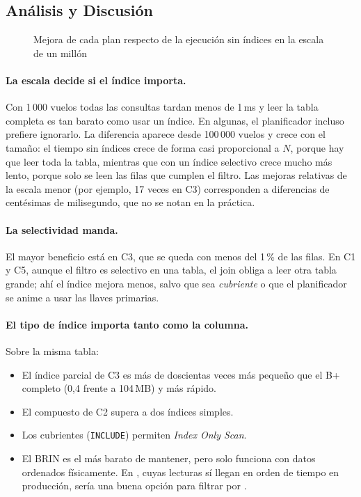 \subsection{Análisis y Discusión}

\begin{figure}[H]\centering{}\caption{Mejora de cada plan respecto de la ejecución sin índices en la escala de un millón}\end{figure}

\paragraph{La escala decide si el índice importa.} Con 1\,000 vuelos todas las consultas tardan menos de 1\,ms y leer la tabla completa es tan barato como usar un índice. En algunas, el planificador incluso prefiere ignorarlo. La diferencia aparece desde 100\,000 vuelos y crece con el tamaño: el tiempo sin índices crece de forma casi proporcional a $N$, porque hay que leer toda la tabla, mientras que con un índice selectivo crece mucho más lento, porque solo se leen las filas que cumplen el filtro. Las mejoras relativas de la escala menor (por ejemplo, 17 veces en C3) corresponden a diferencias de centésimas de milisegundo, que no se notan en la práctica.

\paragraph{La selectividad manda.} El mayor beneficio está en C3, que se queda con menos del 1\,\% de las filas. En C1 y C5, aunque el filtro es selectivo en una tabla, el join obliga a leer otra tabla grande; ahí el índice mejora menos, salvo que sea \emph{cubriente} o que el planificador se anime a usar las llaves primarias.

\paragraph{El tipo de índice importa tanto como la columna.} Sobre la misma tabla:
\begin{itemize}
\item El índice parcial de C3 es más de doscientas veces más pequeño que el B+ completo (0,4 frente a 104\,MB) y más rápido.
\item El compuesto de C2 supera a dos índices simples.
\item Los cubrientes (\texttt{INCLUDE}) permiten \emph{Index Only Scan}.
\item El BRIN es el más barato de mantener, pero solo funciona con datos ordenados físicamente. En , cuyas lecturas sí llegan en orden de tiempo en producción, sería una buena opción para filtrar por .
\end{itemize}

